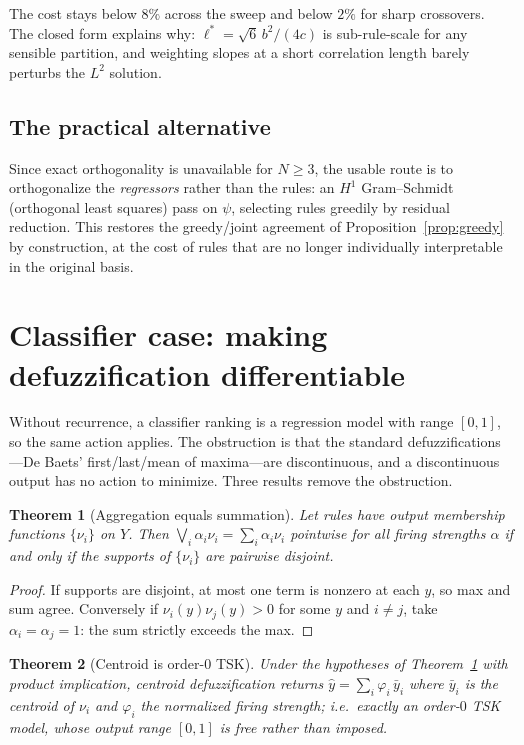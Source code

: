 \documentclass[11pt]{article}
\theoremstyle{plain}
\newtheorem{theorem}{Theorem}
\theoremstyle{definition}
\begin{document}
The cost stays below $8\%$ across the sweep and below $2\%$ for sharp
crossovers. The closed form explains why: $\ell^{*}=\sqrt6\,b^{2}/(4c)$ is
sub-rule-scale for any sensible partition, and weighting slopes at a short
correlation length barely perturbs the $L^2$ solution.

\subsection{The practical alternative}

Since exact orthogonality is unavailable for $N\ge3$, the usable route is to
orthogonalize the \emph{regressors} rather than the rules: an $H^1$
Gram--Schmidt (orthogonal least squares) pass on $\psi$, selecting rules
greedily by residual reduction. This restores the greedy/joint agreement of
Proposition~\ref{prop:greedy} by construction, at the cost of rules that are no
longer individually interpretable in the original basis.

\section{Classifier case: making defuzzification differentiable}
\label{sec:classifier}

Without recurrence, a classifier ranking is a regression model with range
$[0,1]$, so the same action applies. The obstruction is that the standard
defuzzifications---De Baets' first/last/mean of maxima---are discontinuous, and
a discontinuous output has no action to minimize. Three results remove the
obstruction.

\begin{theorem}[Aggregation equals summation]
\label{thm:disjoint}
Let rules have output membership functions $\{\nu_i\}$ on $Y$. Then
$\bigvee_i\alpha_i\nu_i=\sum_i\alpha_i\nu_i$ pointwise for all firing strengths
$\alpha$ if and only if the supports of $\{\nu_i\}$ are pairwise disjoint.
\end{theorem}

\begin{proof}
If supports are disjoint, at most one term is nonzero at each $y$, so max and
sum agree. Conversely if $\nu_i(y)\nu_j(y)>0$ for some $y$ and $i\ne j$, take
$\alpha_i=\alpha_j=1$: the sum strictly exceeds the max.
\end{proof}

\begin{theorem}[Centroid is order-$0$ TSK]
\label{thm:centroid}
Under the hypotheses of Theorem~\ref{thm:disjoint} with product implication,
centroid defuzzification returns
$\hat y=\sum_i\varphi_i\,\bar y_i$ where $\bar y_i$ is the centroid of $\nu_i$
and $\varphi_i$ the normalized firing strength; i.e.\ exactly an order-$0$ TSK
model, whose output range $[0,1]$ is free rather than imposed.
\end{theorem}
\end{document}

